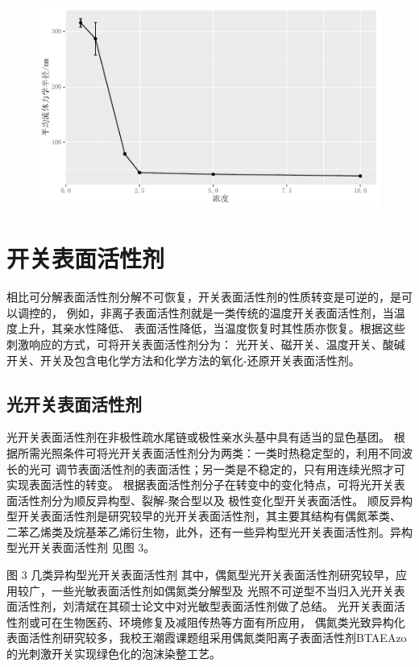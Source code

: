 \documentclass[bachelor,winfonts]{jnuthesis} %
\begin{document}
        \begin{figure}
            \centering
            \includegraphics[width=0.7\linewidth]{Figure/test.pdf}
            \caption{}
            \label{fig:plot01}
        \end{figure}
        
    \section{开关表面活性剂}
    相比可分解表面活性剂分解不可恢复，开关表面活性剂的性质转变是可逆的，是可以调控的，
    例如，非离子表面活性剂就是一类传统的温度开关表面活性剂，当温度上升，其亲水性降低、
    表面活性降低，当温度恢复时其性质亦恢复。根据这些刺激响应的方式，可将开关表面活性剂分为：
    光开关、磁开关、温度开关、酸碱开关、开关及包含电化学方法和化学方法的氧化-还原开关表面活性剂\cite{秦勇2009}。
    
    \subsection{光开关表面活性剂}
    光开关表面活性剂在非极性疏水尾链或极性亲水头基中具有适当的显色基团\cite{张冤帝2017}。
    根据所需光照条件可将光开关表面活性剂分为两类：一类时热稳定型的，利用不同波长的光可
    调节表面活性剂的表面活性；另一类是不稳定的，只有用连续光照才可实现表面活性的转变。
    根据表面活性剂分子在转变中的变化特点，可将光开关表面活性剂分为顺反异构型、裂解-聚合型以及
    极性变化型开关表面活性\cite{张冤帝2017,李云霞2011}。
    顺反异构型开关表面活性剂是研究较早的光开关表面活性剂，其主要其结构有偶氮苯类、
    二苯乙烯类及烷基苯乙烯衍生物，此外，还有一些异构型光开关表面活性剂。异构型光开关表面活性剂
    见图 3\cite{张冤帝2017,karthaus1996,shang2003,吕湘亮2018}。
    
    图 3 几类异构型光开关表面活性剂\cite{张冤帝2017,karthaus1996,shang2003,吕湘亮2018}
    其中，偶氮型光开关表面活性剂研究较早，应用较广，一些光敏表面活性剂如偶氮类分解型及
    光照不可逆型不当归入光开关表面活性剂，刘清斌在其硕士论文中对光敏型表面活性剂做了总结\cite{刘清斌2018}。
    光开关表面活性剂或可在生物医药、环境修复及减阻传热等方面有所应用\cite{刘清斌2018}，
    偶氮类光致异构化表面活性剂研究较多，我校王潮霞课题组\cite{chen2016}采用偶氮类阳离子表面活性剂BTAEAzo的光刺激开关实现绿色化的泡沫染整工艺。
    
\end{document}

